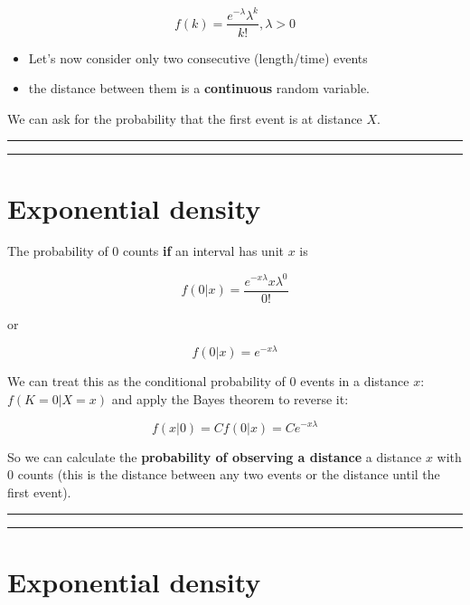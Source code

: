 \documentclass[
]{book}
\begin{document}
\[f(k)=\frac{e^{-\lambda}\lambda^k}{k!}, \lambda>0\]

\begin{itemize}
\item
  Let's now consider only two consecutive (length/time) events
\item
  the distance between them is a \textbf{continuous} random variable.
\end{itemize}

We can ask for the probability that the first event is at distance \(X\).

\begin{center}\rule{0.5\linewidth}{0.5pt}\end{center}

\begin{center}\rule{0.5\linewidth}{0.5pt}\end{center}

\hypertarget{exponential-density-1}{%
\section{Exponential density}\label{exponential-density-1}}

The probability of \(0\) counts \textbf{if} an interval has unit \(x\) is

\[f(0|x)=\frac{e^{-x\lambda}x\lambda^0}{0!}\]

or

\[f(0|x)=e^{-x\lambda}\]

We can treat this as the conditional probability of \(0\) events in a distance \(x\): \(f(K=0|X=x)\) and apply the Bayes theorem to reverse it:

\[f(x|0)=C f(0|x)=C e^{-x\lambda}\]

So we can calculate the \textbf{probability of observing a distance} a distance \(x\) with \(0\) counts (this is the distance between any two events or the distance until the first event).

\begin{center}\rule{0.5\linewidth}{0.5pt}\end{center}

\begin{center}\rule{0.5\linewidth}{0.5pt}\end{center}

\hypertarget{exponential-density-2}{%
\section{Exponential density}\label{exponential-density-2}}
\end{document}
